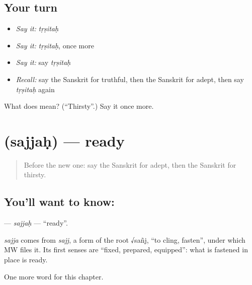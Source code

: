 \subsection*{Your turn}
\begin{itemize}
\raggedright
  \item \emph{Say it:} \emph{tṛṣitaḥ}
  \item \emph{Say it:} \emph{tṛṣitaḥ}, once more
  \item \emph{Say it:} say \emph{tṛṣitaḥ}
  \item \emph{Recall:} say the Sanskrit for truthful, then the Sanskrit for adept, then say \emph{tṛṣitaḥ} again
\end{itemize}

\begin{tcolorbox}[breakable,colback=teal!4,colframe=teal!35!black,title={Before you move on}]
What does  mean? (\textquotedblleft{}Thirsty\textquotedblright{}.) Say it once more.
\end{tcolorbox}
\section[\texorpdfstring{\sk{सज्जः} (sajjaḥ)}{सज्जः (sajjaḥ)}]{ (sajjaḥ) — ready}

\label{lesson:SA-C188-sajjah}



\begin{quote}
Before the new one: say the Sanskrit for adept, then the Sanskrit for thirsty.
\end{quote}

\subsection*{You'll want to know: }
\textbf{} — \emph{sajjaḥ} — \textquotedblleft{}ready\textquotedblright{}.

\begin{cousinweb}
\emph{sajja} comes from \emph{sajj}, a form of the root √sañj, \textquotedblleft{}to cling, fasten\textquotedblright{}, under which MW files it. Its first senses are \textquotedblleft{}fixed, prepared, equipped\textquotedblright{}: what is fastened in place is ready.
\end{cousinweb}

\begin{grammarlens}[title={What you've built}]
One more word for this chapter.
\end{grammarlens}

